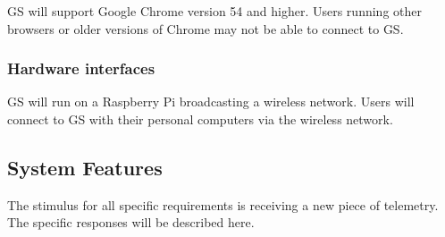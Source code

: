 \documentclass[10pt,draftclsnofoot,onecolumn]{IEEEtran}
\begin{document}
	GS will support Google Chrome version 54 and higher. Users running other browsers or older versions of Chrome
	may not be able to connect to GS.
	\subsubsection{Hardware interfaces}
	GS will run on a Raspberry Pi broadcasting a wireless network. Users will connect to GS with their personal computers
	via the wireless network.
	
	\subsection{System Features}
	
	The stimulus for all specific requirements is receiving a new piece of telemetry. The specific responses will be described here.


		
\end{document}
